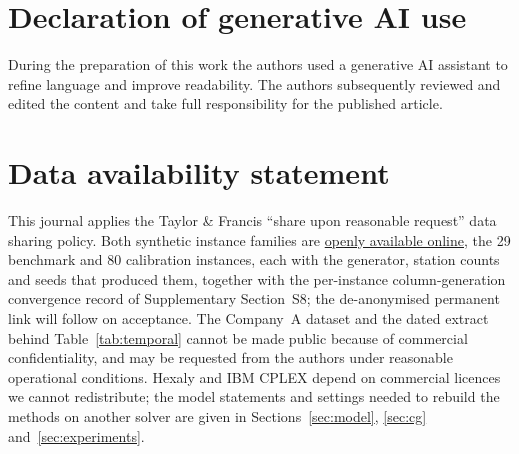 \documentclass[]{interact}
\begin{document}
\section*{Declaration of generative AI use}
During the preparation of this work the authors used a generative AI assistant to refine language and improve readability. The authors subsequently reviewed and edited the content and take full responsibility for the published article.

\section*{Data availability statement}
This journal applies the Taylor \& Francis ``share upon reasonable request'' data sharing policy. Both synthetic instance families are \href{https://anonymous.4open.science/r/Anonymized_Export_CSLAP_v2-01BC/README.md}{openly available online}, the 29 benchmark and 80 calibration instances, each with the generator, station counts and seeds that produced them, together with the per-instance column-generation convergence record of Supplementary Section~S8; the de-anonymised permanent link will follow on acceptance. The Company~A dataset and the dated extract behind Table~\ref{tab:temporal} cannot be made public because of commercial confidentiality, and may be requested from the authors under reasonable operational conditions. Hexaly and IBM CPLEX depend on commercial licences we cannot redistribute; the model statements and settings needed to rebuild the methods on another solver are given in Sections~\ref{sec:model}, \ref{sec:cg} and~\ref{sec:experiments}.




\end{document}

